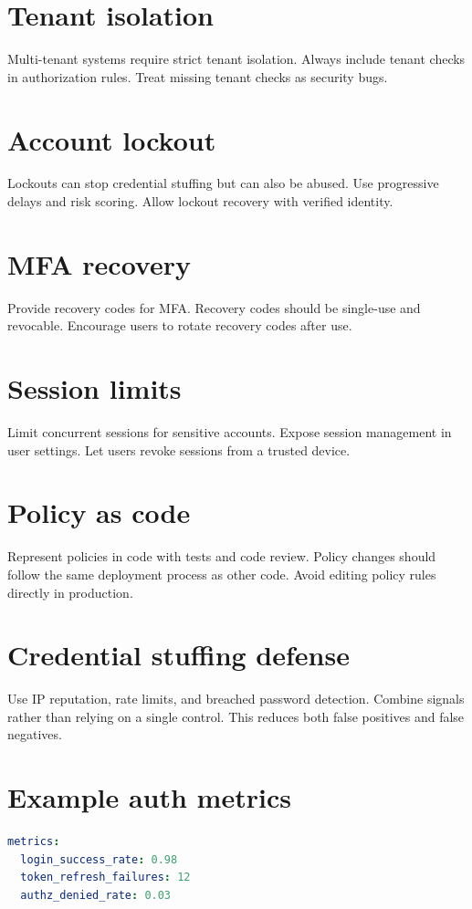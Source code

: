 \section{Tenant isolation}
Multi-tenant systems require strict tenant isolation.
Always include tenant checks in authorization rules.
Treat missing tenant checks as security bugs.

\section{Account lockout}
Lockouts can stop credential stuffing but can also be abused.
Use progressive delays and risk scoring.
Allow lockout recovery with verified identity.

\section{MFA recovery}
Provide recovery codes for MFA.
Recovery codes should be single-use and revocable.
Encourage users to rotate recovery codes after use.

\section{Session limits}
Limit concurrent sessions for sensitive accounts.
Expose session management in user settings.
Let users revoke sessions from a trusted device.

\section{Policy as code}
Represent policies in code with tests and code review.
Policy changes should follow the same deployment process as other code.
Avoid editing policy rules directly in production.

\section{Credential stuffing defense}
Use IP reputation, rate limits, and breached password detection.
Combine signals rather than relying on a single control.
This reduces both false positives and false negatives.

\section{Example auth metrics}
\begin{lstlisting}[language=YAML]
metrics:
  login_success_rate: 0.98
  token_refresh_failures: 12
  authz_denied_rate: 0.03
\end{lstlisting}

